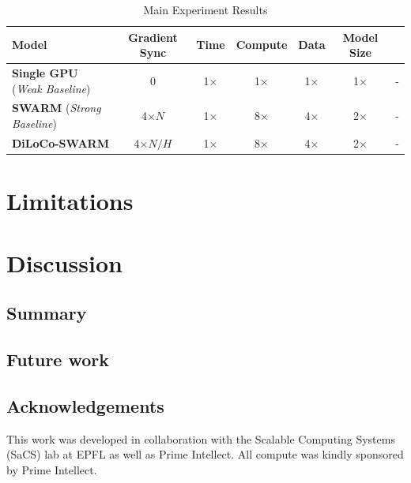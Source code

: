 \documentclass[conference, 10pt]{IEEEtran}
\begin{document}

\begin{table}[t!]
  \centering
  \begin{tabular}{l|cccccc}
  \toprule
  Model & Gradient Sync & Time & Compute & Data & Model Size \\
  \midrule
  \textbf{Single GPU} (\textit{Weak Baseline}) & 0 & 1$\times$ & 1$\times$ & 1$\times$ & 1$\times$ & - \\
  \textbf{SWARM} (\textit{Strong Baseline}) & 4$\times N$ & 1$\times$  & 8$\times$ & 4$\times$ & 2$\times$ & - \\
  \textbf{DiLoCo-SWARM} & 4$\times N/H$ & 1$\times$ & 8$\times$ & 4$\times$ & 2$\times$ & - \\
  \bottomrule
  \end{tabular}
  \caption{Main Experiment Results}
  \label{tab:main-results}
\end{table}


\section{Limitations}
\label{sec:limitations}



\section{Discussion}
\label{sec:discussion}

\subsection{Summary}
\label{subsec:summary}

\subsection{Future work}
\label{subsec:future-work}

\subsection{Acknowledgements}
\label{subsec:acknowledgements}

This work was developed in collaboration with the Scalable Computing Systems
(SaCS) lab at EPFL as well as Prime Intellect. All compute was kindly sponsored
by Prime Intellect.
\end{document}
